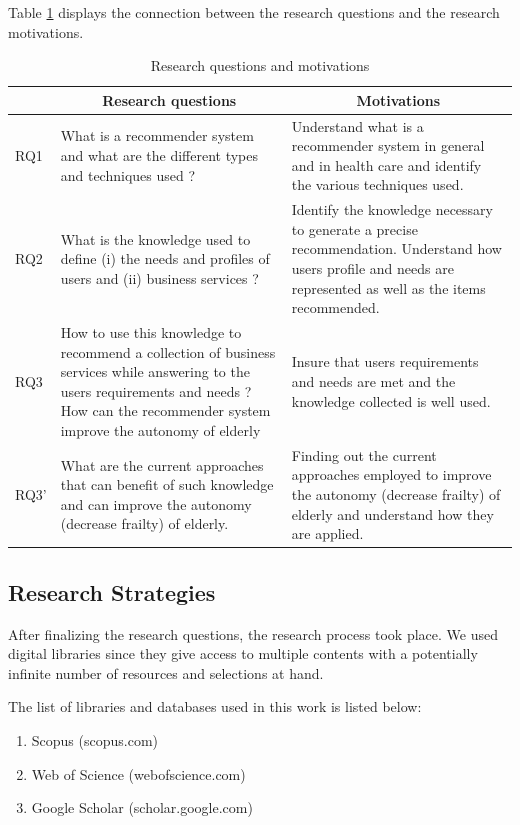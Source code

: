 \documentclass[preprint,3p,times,number]{elsarticle}
\begin{document}
Table \ref{tab:RQ} displays the connection between the research questions and the research motivations.

\begin{table}
\centering
\footnotesize
\begin{tabularx}{\linewidth}{p{1cm}|X|X}
\toprule
&\multicolumn{1}{c|}{\normalsize\textbf{Research questions}} & \multicolumn{1}{c}{\normalsize\textbf{Motivations}} \\
\midrule
RQ1 &  What is a recommender system and what are the different types and techniques used ? & Understand what is a recommender system in general and in health care and identify the various techniques used.
             \\
RQ2 & What is the knowledge used to define (i) the needs and profiles of users and (ii) business services ? & Identify the knowledge necessary to generate a precise recommendation. Understand how users profile and needs are represented as well as the items recommended.
              \\
RQ3 & How to use this knowledge to recommend a collection of business services while answering to the users requirements and needs ? How can the recommender system improve the autonomy of elderly & Insure that users requirements and needs are met and the knowledge collected is well used.
             \\
RQ3' & What are the current approaches that can benefit of such knowledge and can improve the autonomy (decrease frailty) of elderly. & Finding out the current approaches employed to improve the autonomy (decrease frailty) of elderly and understand how they are applied.
            \\
\bottomrule
\end{tabularx}
\caption{Research questions and motivations}
\label{tab:RQ}
\end{table} 

\subsection{Research Strategies}

After finalizing the research questions, the research process took place. We used digital libraries since they give access to multiple contents with a potentially infinite number of resources and selections at hand. 

The list of libraries and databases used in this work is listed below: 
\begin{enumerate}
    \item Scopus (scopus.com)
    \item Web of Science (webofscience.com)
    \item Google Scholar (scholar.google.com)
\end{enumerate}
\end{document}

